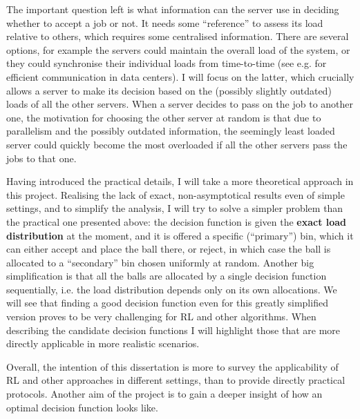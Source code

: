 The important question left is what information can the server use in deciding whether to accept a job or not. It needs some ``reference'' to assess its load relative to others, which requires some centralised information. There are several options, for example the servers could maintain the overall load of the system, or they could synchronise their individual loads from time-to-time (see e.g. \cite{zhang2018datacenterloadbalancing} for efficient communication in data centers). I will focus on the latter, which crucially allows a server to make its decision based on the (possibly slightly outdated) loads of all the other servers. When a server decides to pass on the job to another one, the motivation for choosing the other server at random is that due to parallelism and the possibly outdated information, the seemingly least loaded server could quickly become the most overloaded if all the other servers pass the jobs to that one.


Having introduced the practical details, I will take a more theoretical approach in this project. Realising the lack of exact, non-asymptotical results even of simple settings, and to simplify the analysis, I will try to solve a simpler problem than the practical one presented above: the decision function is given the \textbf{exact load distribution} at the moment, and it is offered a specific (``primary'') bin, which it can either accept and place the ball there, or reject, in which case the ball is allocated to a ``secondary'' bin chosen uniformly at random. Another big simplification is that all the balls are allocated by a single decision function sequentially, i.e. the load distribution depends only on its own allocations. We will see that finding a good decision function even for this greatly simplified version proves to be very challenging for RL and other algorithms. When describing the candidate decision functions I will highlight those that are more directly applicable in more realistic scenarios. 


Overall, the intention of this dissertation is more to survey the applicability of RL and other approaches in different settings, than to provide directly practical protocols. Another aim of the project is to gain a deeper insight of how an optimal decision function looks like.

